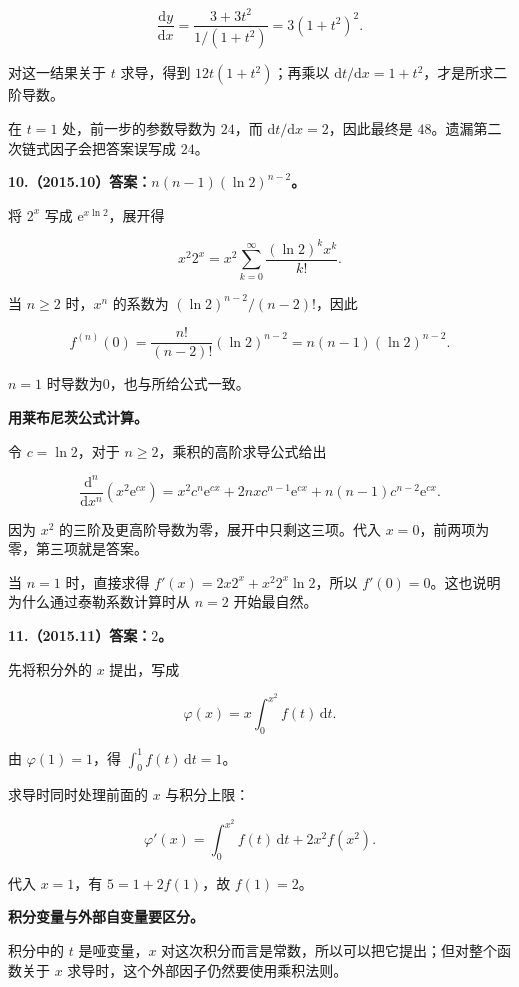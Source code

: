 \documentclass[UTF8,11pt,fontset=windows]{ctexart}
\begin{document}
$$
\frac{\mathrm dy}{\mathrm dx}=\frac{3+3t^2}{1/(1+t^2)}=3(1+t^2)^2.
$$

对这一结果关于 $t$ 求导，得到 $12t(1+t^2)$；再乘以 $\mathrm dt/\mathrm dx=1+t^2$，才是所求二阶导数。

在 $t=1$ 处，前一步的参数导数为 $24$，而 $\mathrm dt/\mathrm dx=2$，因此最终是 $48$。遗漏第二次链式因子会把答案误写成 $24$。

\clearpage

\textbf{10.（2015.10）答案：$n(n-1)(\ln2)^{n-2}$。}

将 $2^x$ 写成 $\mathrm e^{x\ln2}$，展开得

$$
x^2 2^x=x^2\sum_{k=0}^{\infty}\frac{(\ln2)^k x^k}{k!}.
$$

当 $n\ge2$ 时，$x^n$ 的系数为 $(\ln2)^{n-2}/(n-2)!$，因此

$$
f^{(n)}(0)=\frac{n!}{(n-2)!}(\ln2)^{n-2}
=n(n-1)(\ln2)^{n-2}.
$$

$n=1$ 时导数为0，也与所给公式一致。

\textbf{用莱布尼茨公式计算。}

令 $c=\ln2$，对于 $n\ge2$，乘积的高阶求导公式给出

$$
\frac{\mathrm d^n}{\mathrm dx^n}(x^2\mathrm e^{cx})
=x^2c^n\mathrm e^{cx}
+2nx c^{n-1}\mathrm e^{cx}
+n(n-1)c^{n-2}\mathrm e^{cx}.
$$

因为 $x^2$ 的三阶及更高阶导数为零，展开中只剩这三项。代入 $x=0$，前两项为零，第三项就是答案。

当 $n=1$ 时，直接求得 $f'(x)=2x2^x+x^2 2^x\ln2$，所以 $f'(0)=0$。这也说明为什么通过泰勒系数计算时从 $n=2$ 开始最自然。

\clearpage

\textbf{11.（2015.11）答案：$2$。}

先将积分外的 $x$ 提出，写成

$$
\varphi(x)=x\int_0^{x^2}f(t)\,\mathrm dt.
$$

由 $\varphi(1)=1$，得 $\int_0^1f(t)\,\mathrm dt=1$。

求导时同时处理前面的 $x$ 与积分上限：

$$
\varphi'(x)=\int_0^{x^2}f(t)\,\mathrm dt+2x^2f(x^2).
$$

代入 $x=1$，有 $5=1+2f(1)$，故 $f(1)=2$。

\textbf{积分变量与外部自变量要区分。}

积分中的 $t$ 是哑变量，$x$ 对这次积分而言是常数，所以可以把它提出；但对整个函数关于 $x$ 求导时，这个外部因子仍然要使用乘积法则。
\end{document}
